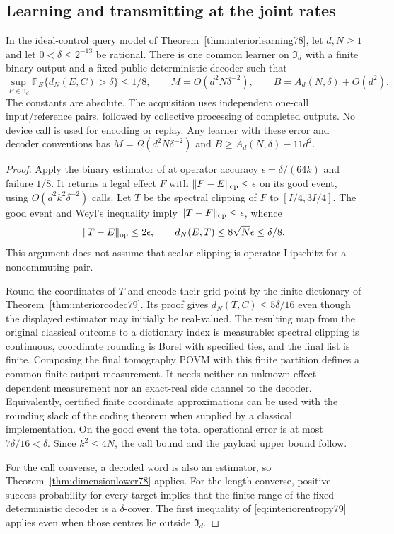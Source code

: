 \subsection{Learning and transmitting at the joint rates}
\begin{theorem}
\label{thm:interiorlearnedcode79}
In the ideal-control query model of
Theorem~\ref{thm:interiorlearning78}, let $d,N\ge1$ and let
$0<\delta\le2^{-13}$ be rational.  There is one common learner
on $\mathfrak I_d$ with a finite binary output and a fixed public
deterministic decoder such that
\begin{equation}\label{eq:interiorlearned79}
 \sup_{E\in\mathfrak I_d}
   \mathbb P_E\{d_N(E,C)>\delta\}\le1/8,\qquad
 M=O(d^2N\delta^{-2}),\qquad
 B=A_d(N,\delta)+O(d^2).
\end{equation}
The constants are absolute.  The acquisition uses independent
one-call input/reference pairs, followed by collective processing
of completed outputs.  No device call is used for encoding or
replay.  Any learner with these error and decoder conventions has
$M=\Omega(d^2N\delta^{-2})$ and
$B\ge A_d(N,\delta)-11d^2$.
\end{theorem}
\begin{proof}
Apply the binary estimator of \cite[Corollary~III.9]{MB67} at
operator accuracy $\epsilon=\delta/(64k)$ and failure $1/8$.
It returns a legal effect $F$ with $\|F-E\|_{\rm op}\le\epsilon$
on its good event, using $O(d^2k^2\delta^{-2})$ calls.
Let $T$ be the spectral clipping of $F$ to $[I/4,3I/4]$.
The good event and Weyl's inequality imply
$\|T-F\|_{\rm op}\le\epsilon$, whence
\[
 \|T-E\|_{\rm op}\le2\epsilon,\qquad
 d_N(E,T)\le8\sqrt N\epsilon\le\delta/8.
\]
This argument does not assume that scalar clipping is
operator-Lipschitz for a noncommuting pair.

Round the coordinates of $T$ and encode their grid point by the
finite dictionary of Theorem~\ref{thm:interiorcodec79}.  Its proof
gives $d_N(T,C)\le5\delta/16$ even though the displayed estimator
may initially be real-valued.  The resulting map from the original
classical outcome to a dictionary index is measurable: spectral
clipping is continuous, coordinate rounding is Borel with specified
ties, and the final list is finite.  Composing the final tomography
POVM with this finite partition defines a common finite-output
measurement.  It needs neither an unknown-effect-dependent
measurement nor an exact-real side channel to the decoder.
Equivalently, certified finite coordinate approximations can be used
with the rounding slack of the coding theorem when supplied by a
classical implementation.  On the good event the total operational
error is at most $7\delta/16<\delta$.  Since $k^2\le4N$, the call
bound and the payload upper bound follow.

For the call converse, a decoded word is also an estimator, so
Theorem~\ref{thm:dimensionlower78} applies.  For the length converse,
positive success probability for every target implies that the finite
range of the fixed deterministic decoder is a $\delta$-cover.
The first inequality of \eqref{eq:interiorentropy79} applies even
when those centres lie outside $\mathfrak I_d$.
\end{proof}

